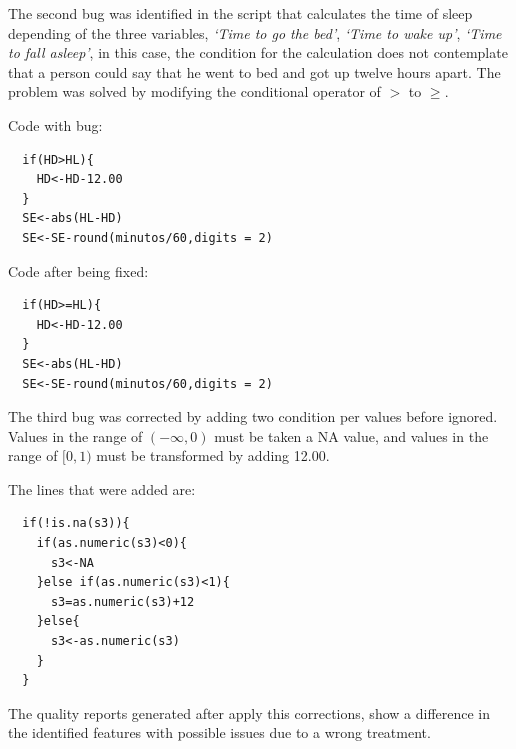 \documentclass[]{book}
\begin{document}
The second bug was identified in the script that calculates the time of
sleep depending of the three variables, \emph{`Time to go the bed'},
\emph{`Time to wake up'}, \emph{`Time to fall asleep'}, in this case,
the condition for the calculation does not contemplate that a person
could say that he went to bed and got up twelve hours apart. The problem
was solved by modifying the conditional operator of \(>\) to \(\geq\).

Code with bug:

\begin{verbatim}
  if(HD>HL){
    HD<-HD-12.00
  }
  SE<-abs(HL-HD)
  SE<-SE-round(minutos/60,digits = 2)
\end{verbatim}

Code after being fixed:

\begin{verbatim}
  if(HD>=HL){
    HD<-HD-12.00
  }
  SE<-abs(HL-HD)
  SE<-SE-round(minutos/60,digits = 2)
\end{verbatim}

The third bug was corrected by adding two condition per values before
ignored. Values in the range of \((-\infty,0)\) must be taken a NA
value, and values in the range of \([0,1)\) must be transformed by
adding 12.00.

The lines that were added are:

\begin{verbatim}
  if(!is.na(s3)){
    if(as.numeric(s3)<0){
      s3<-NA
    }else if(as.numeric(s3)<1){
      s3=as.numeric(s3)+12
    }else{
      s3<-as.numeric(s3)
    }
  }
\end{verbatim}

The quality reports generated after apply this corrections, show a
difference in the identified features with possible issues due to a
wrong treatment.
\end{document}
